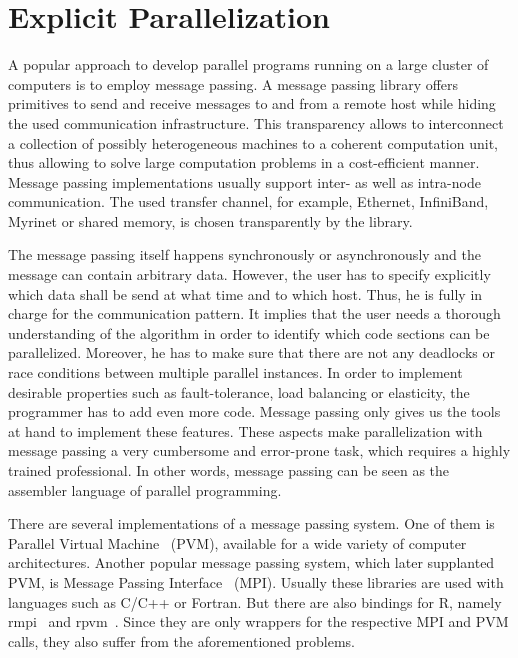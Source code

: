 \section{Explicit Parallelization}

A popular approach to develop parallel programs running on a large cluster of computers is to employ message passing.
A message passing library offers primitives to send and receive messages to and from a remote host while hiding the used communication infrastructure.
This transparency allows to interconnect a collection of possibly heterogeneous machines to a coherent computation unit, thus allowing to solve large computation problems in a cost-efficient manner.
Message passing implementations usually support inter- as well as intra-node communication.
The used transfer channel, for example, Ethernet, InfiniBand, Myrinet or shared memory, is chosen transparently by the library.

The message passing itself happens synchronously or asynchronously and the message can contain arbitrary data.
However, the user has to specify explicitly which data shall be send at what time and to which host.
Thus, he is fully in charge for the communication pattern.
It implies that the user needs a thorough understanding of the algorithm in order to identify which code sections can be parallelized.
Moreover, he has to make sure that there are not any deadlocks or race conditions between multiple parallel instances.
In order to implement desirable properties such as fault-tolerance, load balancing or elasticity, the programmer has to add even more code.
Message passing only gives us the tools at hand to implement these features.
These aspects make parallelization with message passing a very cumbersome and error-prone task, which requires a highly trained professional.
In other words, message passing can be seen as the assembler language of parallel programming.

There are several implementations of a message passing system.
One of them is Parallel Virtual Machine~\cite{geist:1994a} (PVM), available for a wide variety of computer architectures.
Another popular message passing system, which later supplanted PVM, is Message Passing Interface~\cite{lusk:2009a} (MPI).
Usually these libraries are used with languages such as C/C++ or Fortran.
But there are also bindings for R, namely rmpi~\cite{rmpi} and rpvm~\cite{rpvm}.
Since they are only wrappers for the respective MPI and PVM calls, they also suffer from the aforementioned problems.

